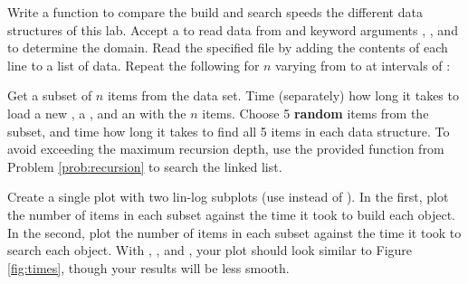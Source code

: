 \begin{problem}
Write a function to compare the build and search speeds the different data structures of this lab.
Accept a  to read data from and keyword arguments , , and  to determine the domain.
Read the specified file by adding the contents of each line to a list of data.
Repeat the following for $n$ varying from  to  at intervals of :

Get a subset of $n$ items from the data set.
Time (separately) how long it takes to load a new , a , and an  with the $n$ items.
Choose 5 \textbf{random} items from the subset, and time how long it takes to find all 5 items in each data structure.
To avoid exceeding the maximum recursion depth, use the provided  function from Problem \ref{prob:recursion} to search the linked list.

Create a single plot with two lin-log subplots (use  instead of ).
In the first, plot the number of items in each subset against the time it took to build each object.
In the second, plot the number of items in each subset against the time it took to search each object.
With , , and , your plot should look similar to Figure \ref{fig:times}, though your results will be less smooth.


\end{problem}
